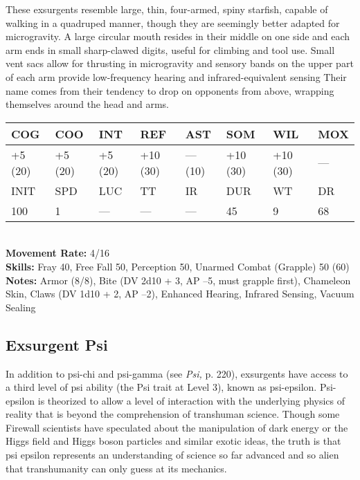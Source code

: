 These exsurgents resemble large, thin, four-armed, spiny starfish, capable of walking in a quadruped manner, though they are seemingly better adapted for microgravity. A large circular mouth resides in their middle on one side and each arm ends in small sharp-clawed digits, useful for climbing and tool use. Small vent sacs allow for thrusting in microgravity and sensory bands on the upper part of each arm provide low-frequency hearing and infrared-equivalent sensing Their name comes from their tendency to drop on opponents from above, wrapping themselves around the head and arms. \\ \begin{tabular}{|l|l|l|l|l|l|l|l|} \hline

COG &COO &INT &REF &AST &SOM &WIL &MOX \\ \hline

+5 (20) &+5 (20) &+5 (20) &+10 (30) &— (10) &+10 (30) &+10 (30) &— \\ \hline

INIT &SPD &LUC &TT &IR &DUR &WT &DR \\ \hline

100 &1 &— &— &— &45 &9 &68 \\ \hline

\end{tabular} \\ \textbf{Movement Rate:} 4/16 \\ \textbf{Skills:} Fray 40, Free Fall 50, Perception 50, Unarmed Combat (Grapple) 50 (60) \\ \textbf{Notes: }Armor (8/8), Bite (DV 2d10 + 3, AP –5, must grapple first), Chameleon Skin, Claws (DV 1d10 + 2, AP –2), Enhanced Hearing, Infrared Sensing, Vacuum Sealing 



\subsection{Exsurgent Psi } 

In addition to psi-chi and psi-gamma (see \textit{Psi,} p. 220), exsurgents have access to a third level of psi ability (the Psi trait at Level 3), known as psi-epsilon. Psi-epsilon is theorized to allow a level of interaction with the underlying physics of reality that is beyond the comprehension of transhuman science. Though some Firewall scientists have speculated about the manipulation of dark energy or the Higgs field and Higgs boson particles and similar exotic ideas, the truth is that psi epsilon represents an understanding of science so far advanced and so alien that transhumanity can only guess at its mechanics. 

